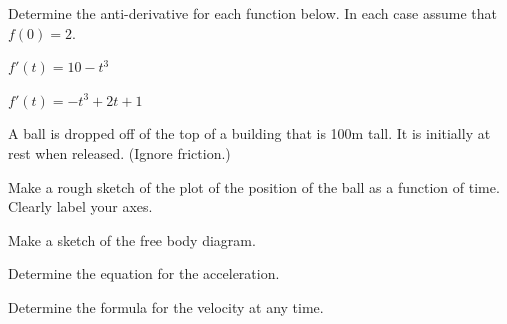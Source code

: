 
\begin{problem}
\item Determine the anti-derivative for each function below. In each
  case assume that $f(0)=2$.
  \begin{subproblem}
  \item $f'(t)= 10 - t^3$
    \vfill
  \item $f'(t)= -t^3+2t+1$
    \vfill
  \end{subproblem}

  \clearpage

\item A ball is dropped off of the top of a building that is 100m
  tall. It is initially at rest when released. (Ignore friction.)
  \begin{subproblem}
    \item Make a rough sketch of the plot of the position of the ball
      as a function of time. Clearly label your axes.

      \vfill

    \item Make a sketch of the free body diagram.
      \vfill

    \item Determine the equation for the acceleration.
      \vspace{10em}


    \item Determine the formula for the velocity at any time.
      \vfill

  \end{subproblem}

\end{problem}



